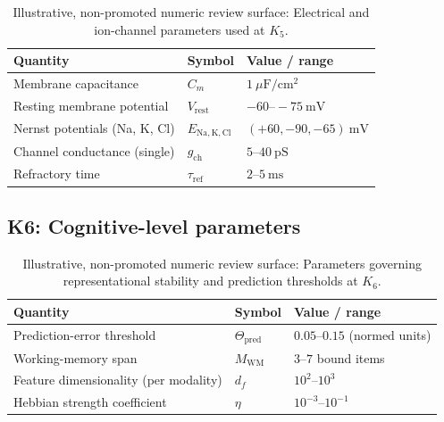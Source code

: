 \begin{table}[h]
  \centering
  \caption{Illustrative, non-promoted numeric review surface: Electrical and ion-channel parameters used at \(K_5\).}
  \label{tab:k5-excitable-parameters}
  \begin{tabular}{lll}
    \hline
    Quantity & Symbol & Value / range \\
    \hline
    Membrane capacitance & \(C_m\)
        & \(1~\mu\mathrm{F/cm^2}\) \\
    Resting membrane potential & \(V_\mathrm{rest}\)
        & \(-60\text{–}-75~\mathrm{mV}\) \\
    Nernst potentials (Na, K, Cl) &
        \(E_{\mathrm{Na,K,Cl}}\)
        & \((+60, -90, -65)~\mathrm{mV}\) \\
    Channel conductance (single) & \(g_\mathrm{ch}\)
        & \(5\text{–}40~\mathrm{pS}\) \\
    Refractory time & \(\tau_\mathrm{ref}\)
        & \(2\text{–}5~\mathrm{ms}\) \\
    \hline
  \end{tabular}
\end{table}


\subsection*{K6: Cognitive-level parameters}

\begin{table}[h]
  \centering
  \caption{Illustrative, non-promoted numeric review surface: Parameters governing representational stability and prediction thresholds at \(K_6\).}
  \label{tab:k6-cognitive-parameters}
  \begin{tabular}{lll}
    \hline
    Quantity & Symbol & Value / range \\
    \hline
    Prediction-error threshold & \(\Theta_{\mathrm{pred}}\)
        & \(0.05\text{–}0.15\) (normed units) \\
    Working-memory span & \(M_\mathrm{WM}\)
        & \(3\text{–}7\) bound items \\
    Feature dimensionality (per modality)
        & \(d_f\)
        & \(10^2\text{–}10^3\) \\
    Hebbian strength coefficient & \(\eta\)
        & \(10^{-3}\text{–}10^{-1}\) \\
    \hline
  \end{tabular}
\end{table}

